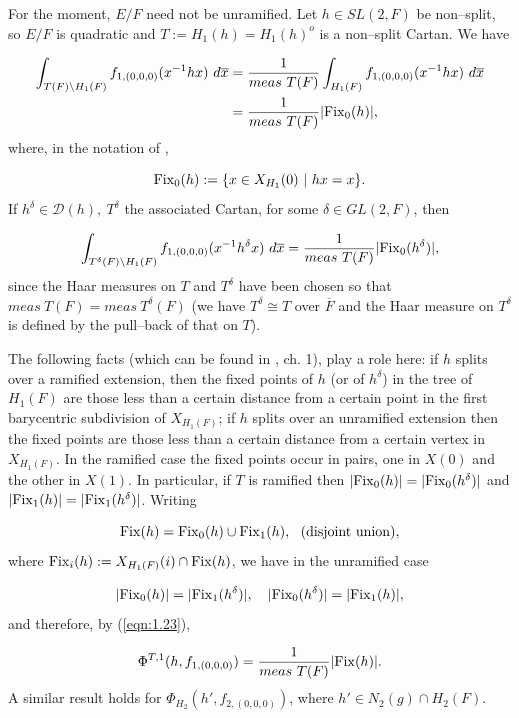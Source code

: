 \documentclass[12pt,letterpaper]{amsart}
\numberwithin{equation}{section}
\theoremstyle{definition}
\theoremstyle{plain}
\providecommand{\cal}{\mathcal}
\def\ddd{{\cal D}}
\def\ovF{\overline{F}}
\def\ovx{\overline{x}}
\begin{document}
 
For the moment, $E/F$ need not be unramified. 
Let $h\in SL(2,F)$ be non--split,
so $E/F$ is quadratic and $T:=H_1(h)=H_1(h)^o$ is a non--split Cartan. 
We have

\begin{equation}
\label{eqn:3.11}
\begin{split}
\int_{T(F)\setminus H_1(F)} f_{1,(0,0,0)}(x^{-1}hx)\ d\ovx
&={1\over{meas\ T(F)}}
\int_{H_1(F)} f_{1,(0,0,0)}(x^{-1}hx)\ d\ovx\\
&={1\over{meas\ T(F)}}|{\rm Fix} _0(h)|,
\end{split}
\end{equation}
where, in the notation of \cite{Ko81},

\[
{\rm Fix}_0(h):=\{x\in X_{H_1}(0)\ |\ hx=x\}.
\]
If $h^\delta\in \ddd (h),\ T^\delta$ the associated Cartan, for some
$\delta\in GL(2,F)$, then

\[
\int_{T^\delta (F)\setminus H_1(F)} f_{1,(0,0,0)}(x^{-1}h^\delta x)\ d\ovx
= {1\over{meas\ T(F)}}|{\rm Fix} _0(h^\delta )|,
\]
since the Haar measures on $T$ and $T^\delta $ have been chosen so that
$meas\ T(F)=meas\ T^\delta (F)$ (we have $T^\delta \cong T$ over $\ovF$ and
the Haar measure on $T^\delta $ is defined by the pull--back of that 
on $T$).
 
The following facts (which can be found in \cite{Bl85}, ch. 1), 
play a role here: if $h$ splits over a
ramified extension, then the fixed points of $h$ (or of $h^\delta $) in
the tree of $H_1(F)$ are those less than a certain distance
from a certain point in the first barycentric
subdivision of $X_{H_1(F)}$; if $h$ splits over an unramified extension
then the fixed points are those less than a certain distance from a 
certain vertex in $X_{H_1(F)}$. In the ramified case the fixed 
points occur in pairs, one in $X(0)$ and
the other in $X(1)$. In particular, if $T$ is ramified then 
$|{\rm Fix} _0(h)| = |{\rm Fix} _0(h^\delta )|$ and
$|{\rm Fix} _1(h)| = |{\rm Fix} _1(h^\delta )|$. Writing

\[
{\rm Fix}(h) = {\rm Fix} _0(h)\cup {\rm Fix}_1(h),
\ \ {\rm (disjoint\ union)},
\]
where ${\rm Fix}_i(h):= X_{H_1(F)}(i)\cap {\rm Fix} (h)$, we have
in the unramified case

\[
|{\rm Fix} _0(h)|=|{\rm Fix} _1(h^\delta )|,
\ \ \ |{\rm Fix} _0(h^\delta )|=|{\rm Fix} _1(h)|,
\]
and therefore, by (\ref{eqn:1.23}),

\begin{equation}
\label{eqn:3.12}
\Phi^{T,1}(h,f_{1,(0,0,0)}) = {1\over{meas\ T(F)}}|{\rm Fix} (h)|.
\end{equation}
A similar result holds for $\Phi_{H_2}(h',f_{2,(0,0,0)})$, where
$h'\in N_2(g)\cap H_2(F)$.
 
\end{document}
